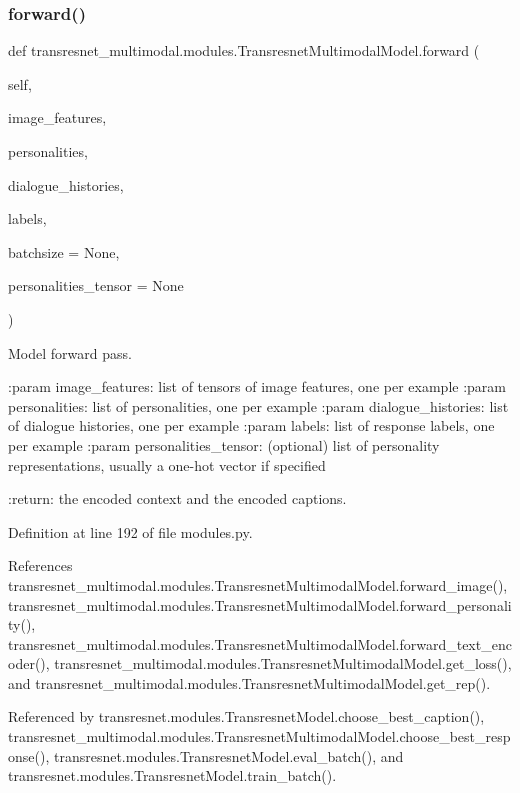 \subsubsection{\texorpdfstring{forward()}{forward()}}
{\footnotesize\ttfamily def transresnet\+\_\+multimodal.\+modules.\+Transresnet\+Multimodal\+Model.\+forward (\begin{DoxyParamCaption}\item[{}]{self,  }\item[{}]{image\+\_\+features,  }\item[{}]{personalities,  }\item[{}]{dialogue\+\_\+histories,  }\item[{}]{labels,  }\item[{}]{batchsize = {\ttfamily None},  }\item[{}]{personalities\+\_\+tensor = {\ttfamily None} }\end{DoxyParamCaption})}

\begin{DoxyVerb}Model forward pass.

:param image_features:
    list of tensors of image features, one per example
:param personalities:
    list of personalities, one per example
:param dialogue_histories:
    list of dialogue histories, one per example
:param labels:
    list of response labels, one per example
:param personalities_tensor:
    (optional) list of personality representations, usually a one-hot
    vector if specified

:return:
    the encoded context and the encoded captions.
\end{DoxyVerb}
 

Definition at line 192 of file modules.\+py.



References transresnet\+\_\+multimodal.\+modules.\+Transresnet\+Multimodal\+Model.\+forward\+\_\+image(), transresnet\+\_\+multimodal.\+modules.\+Transresnet\+Multimodal\+Model.\+forward\+\_\+personality(), transresnet\+\_\+multimodal.\+modules.\+Transresnet\+Multimodal\+Model.\+forward\+\_\+text\+\_\+encoder(), transresnet\+\_\+multimodal.\+modules.\+Transresnet\+Multimodal\+Model.\+get\+\_\+loss(), and transresnet\+\_\+multimodal.\+modules.\+Transresnet\+Multimodal\+Model.\+get\+\_\+rep().



Referenced by transresnet.\+modules.\+Transresnet\+Model.\+choose\+\_\+best\+\_\+caption(), transresnet\+\_\+multimodal.\+modules.\+Transresnet\+Multimodal\+Model.\+choose\+\_\+best\+\_\+response(), transresnet.\+modules.\+Transresnet\+Model.\+eval\+\_\+batch(), and transresnet.\+modules.\+Transresnet\+Model.\+train\+\_\+batch().

